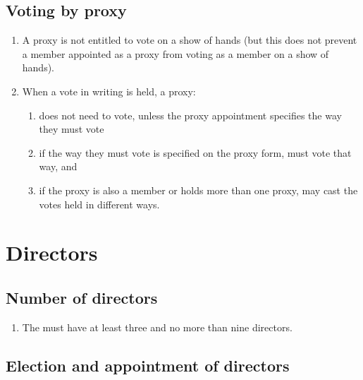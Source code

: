 \documentclass[a4paper]{article}
\let\emph\relax
\begin{document}
\subsection{Voting by proxy}

\begin{enumerate}
\item A proxy is not entitled to vote on a show of hands (but this does not prevent a member appointed as a proxy from voting as a member on a show of hands).
\item When a vote in writing is held, a proxy:
    \begin{enumerate}
    \item does not need to vote, unless the proxy appointment specifies the way they must vote
    \item if the way they must vote is specified on the proxy form, must vote that way, and
    \item if the proxy is also a member or holds more than one proxy, may cast the votes held in different ways.
    \end{enumerate}
\end{enumerate}


\section{Directors}

\subsection{Number of directors}

\begin{enumerate}
\item The \emph{company} must have at least three and no more than nine directors.
\end{enumerate}

\subsection{Election and appointment of directors}
\end{document}
